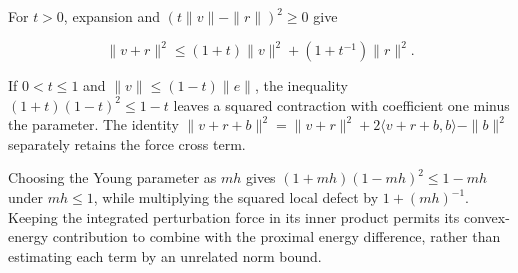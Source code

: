 \documentclass[11pt,a4paper]{report}
\begin{document}
For \(t>0\), expansion and \((t\|v\|-\|r\|)^2\ge0\) give

\[\|v+r\|^2\le(1+t)\|v\|^2+(1+t^{-1})\|r\|^2.\]

If \(0<t\le1\) and \(\|v\|\le(1-t)\|e\|\), the inequality \((1+t)(1-t)^2\le1-t\) leaves a squared contraction with coefficient one minus the parameter. The identity \(\|v+r+b\|^2=\|v+r\|^2+2\langle v+r+b,b\rangle-\|b\|^2\) separately retains the force cross term.



Choosing the Young parameter as \(mh\) gives \((1+mh)(1-mh)^2\le1-mh\) under \(mh\le1\), while multiplying the squared local defect by \(1+(mh)^{-1}\). Keeping the integrated perturbation force in its inner product permits its convex-energy contribution to combine with the proximal energy difference, rather than estimating each term by an unrelated norm bound.
\end{document}

